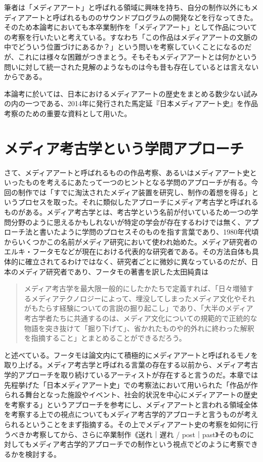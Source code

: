 \documentclass[a4paper,report]{jsbook}
\begin{document}
筆者は「メディアアート」と呼ばれる領域に興味を持ち、自分の制作以外にもメディアアートと呼ばれるもののサウンドプログラムの開発などを行なってきた。そのため本論考においても本卒業制作を「メディアアート」として作品についての考察を行いたいと考えている。すなわち「この作品はメディアアートの文脈の中でどういう位置づけにあるか？」という問いを考察していくことになるのだが、これには様々な困難がつきまとう。そもそもメディアアートとは何かという問いに対して統一された見解のようなものは今も昔も存在しているとは言えないからである。

本論考に於いては、日本におけるメディアアートの歴史をまとめる数少ない試みの内の一つである、2014年に発行された馬定延『日本メディアアート史』を作品考察のための重要な資料として用いた。

\section{メディア考古学という学問アプローチ}\label{ux30e1ux30c7ux30a3ux30a2ux8003ux53e4ux5b66ux3068ux3044ux3046ux5b66ux554fux30a2ux30d7ux30edux30fcux30c1}

さて、メディアアートと呼ばれるものの作品考察、あるいはメディアアート史といったものを考えるにあたって一つのヒントとなる学問のアプローチが有る。今回の制作では「すでに淘汰されたメディア装置を研究し、制作の着想を得る」というプロセスを取った。それに類似したアプローチにメディア考古学と呼ばれるものがある。メディア考古学とは、考古学という名前が付いているため一つの学問分野のように思えるかもしれないが特定の学会が存在するわけでは無く、アプローチ法と書いたように学問のプロセスそのものを指す言葉であり、1980年代頃からいくつかこの名前がメディア研究において使われ始めた。メディア研究者のエルキ・フータモなどが現在における代表的な研究者である。その方法自体も具体的に確立されてるわけではなく、研究者ごとに微妙に異なっているのだが、日本のメディア研究者であり、フータモの著書を訳した太田純貴は

\begin{quote}
メディア考古学を最大限一般的にしたかたちで定義すれば、「日々増殖するメディアテクノロジーによって、埋没してしまったメディア文化やそれがもたらす経験についての言説の掘り起こし」であり、「大半のメディア考古学者たちに共通するのは、メディア文化についての規範的で正統的な物語を突き抜けて「掘り下げて」、省かれたものや的外れに終わった解釈を指摘すること」とまとめることができるだろう。
\end{quote}

と述べている\autocite{ohta:mediaarch}。フータモは論文内にて積極的にメディアアートと呼ばれるモノを取り上げる\autocite{huhtamo:mediaarcheology}。メディア考古学と呼ばれる言葉の存在する以前から、メディア考古学的アプローチを取り続けているアーティストが存在すると言うのだ。本章では先程挙げた「日本メディアアート史」での考察法において用いられた「作品が作られる舞台となった施設やイベント、社会的状況を中心にメディアアートの歴史を考察する」というアプローチを参考にし、メディアアートと言われる領域全体を考察する上での視点についてもメディア考古学的アプローチと言うものが考えられるということをまず指摘する。その上でメディアアート史の考察を如何に行うべきか考察してから、さらに卒業制作《送れ｜遅れ
/
post｜past》そのものに対してもメディア考古学的アプローチでの制作という視点でどのように考察できるかを検討する。
\end{document}
